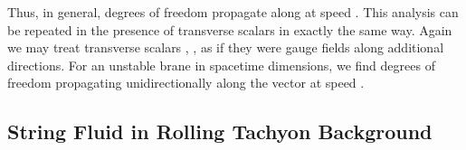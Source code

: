 \documentclass[a4paper,12pt]{article}
\begin{document}
Thus, in general, \coordHE{} degrees of freedom propagate along \coordHE{} at speed \coordHE{}.
This analysis can be repeated in the presence of transverse scalars
\coordHE{} in exactly the same way. Again we may treat transverse scalars
\coordHE{}, \coordHE{}, as if they were gauge fields along
additional directions. For an unstable brane in \coordHE{} spacetime
dimensions, we find   \coordHE{}  degrees of freedom
propagating unidirectionally  along the vector \coordHE{} at speed
\coordHE{}. 

\subsection{String Fluid in Rolling Tachyon Background}
\end{document}
